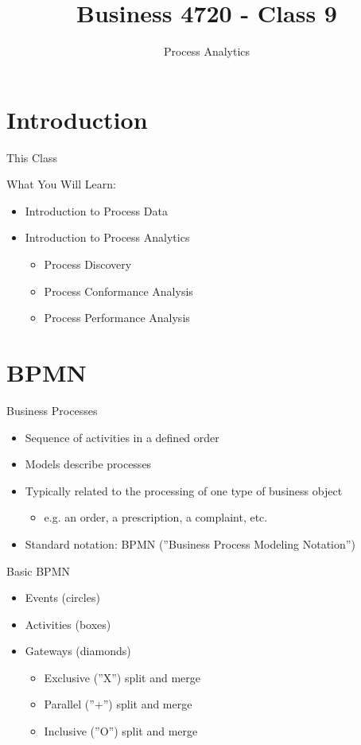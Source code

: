 \documentclass[ignorenonframetext,xcolor=x11names]{beamer}
\title{Business 4720 - Class 9}
\subtitle{Process Analytics}
\begin{document}
\begin{frame}{}
  \titlepage
  \footnotesize
  
\end{frame}

\section{Introduction}

\begin{frame}{This Class}

\begin{block}{What You Will Learn:}
\begin{itemize}
  \item Introduction to Process Data
  \item Introduction to Process Analytics
  \begin{itemize}
     \item Process Discovery
     \item Process Conformance Analysis
     \item Process Performance Analysis
  \end{itemize}
\end{itemize}
\end{block}
\end{frame}

\section{BPMN}

\begin{frame}{Business Processes}
\begin{itemize}
   \item Sequence of activities in a defined order
   \item Models describe processes
   \item Typically related to the processing of one type of business object
   \begin{itemize}
      \item e.g. an order, a prescription, a complaint, etc.
   \end{itemize}
   \item Standard notation: BPMN (''Business Process Modeling Notation'')
\end{itemize}

\begin{block}{Basic BPMN}
\begin{itemize}
   \item Events (circles)
   \item Activities (boxes)
   \item Gateways (diamonds)
   \begin{itemize}
      \item Exclusive (''X'') split and merge
      \item Parallel (''+'') split and merge
      \item Inclusive (''O'') split and merge
   \end{itemize}
\end{itemize}
\end{block}
\end{frame}
\end{document}
